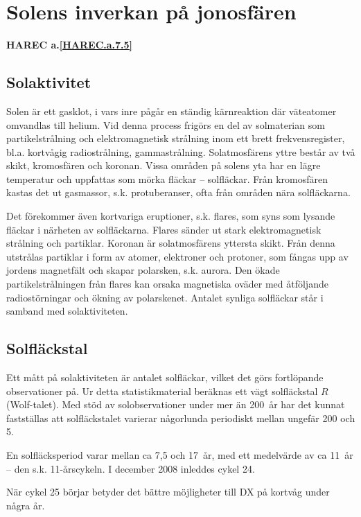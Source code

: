 \section[Solens inverkan]{Solens inverkan på jonosfären}
\textbf{
HAREC a.\ref{HAREC.a.7.5}\label{myHAREC.a.7.5}
}

\subsection{Solaktivitet}

Solen är ett gasklot, i vars inre pågår en ständig kärnreaktion där
väteatomer omvandlas till helium. Vid denna process frigörs en del av
solmaterian som partikelstrålning och elektromagnetisk strålning inom
ett brett frekvensregister, bl.a. kortvågig radiostrålning,
gammastrålning. Solatmosfärens yttre består av två skikt, kromosfären
och koronan. Vissa områden på solens yta har en lägre temperatur och
uppfattas som mörka fläckar -- solfläckar. Från kromosfären kastas det
ut gasmassor, s.k. protuberanser, ofta från områden nära solfläckarna.

Det förekommer även kortvariga eruptioner, s.k. flares, som syns som
lysande fläckar i närheten av solfläckarna. Flares sänder ut stark
elektromagnetisk strålning och partiklar. Koronan är solatmosfärens
yttersta skikt. Från denna utstrålas partiklar i form av atomer,
elektroner och protoner, som fångas upp av jordens magnetfält och
skapar polarsken, s.k. aurora. Den ökade partikelstrålningen från
flares kan orsaka magnetiska oväder med åtföljande radiostörningar och
ökning av polarskenet. Antalet synliga solfläckar står i samband med
solaktiviteten.

\subsection{Solfläckstal}

Ett mått på solaktiviteten är antalet solfläckar, vilket det görs
fortlöpande observationer på. Ur detta statistikmaterial beräknas ett
vägt solfläckstal \(R\) (Wolf-talet). Med stöd av solobservationer
under mer än 200~år har det kunnat fastställas att solfläckstalet
varierar någorlunda periodiskt mellan ungefär 200 och 5.

En solfläcksperiod varar mellan ca 7,5 och 17~år, med ett medelvärde
av ca 11~år -- den s.k. 11-årscykeln.
I december 2008 inleddes cykel 24.

När cykel 25 börjar betyder det bättre möjligheter till DX på
kortvåg under några år.

